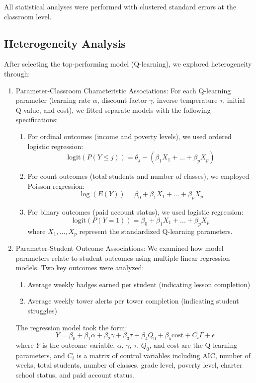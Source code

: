 \documentclass[
  number,
  preprint,
  3p,
  onecolumn]{elsarticle}
\providecommand{\tightlist}{%
  \setlength{\itemsep}{0pt}\setlength{\parskip}{0pt}}
\begin{document}
All statistical analyses were performed with clustered standard errors
at the classroom level.

\subsection{Heterogeneity Analysis}\label{heterogeneity-analysis}

After selecting the top-performing model (Q-learning), we explored
heterogeneity through:

\begin{enumerate}
\def\labelenumi{\arabic{enumi}.}
\item
  Parameter-Classroom Characteristic Associations: For each Q-learning
  parameter (learning rate \(\alpha\), discount factor \(\gamma\),
  inverse temperature \(\tau\), initial Q-value, and cost), we fitted
  separate models with the following specifications:

  \begin{enumerate}
  \def\labelenumii{\alph{enumii})}
  \tightlist
  \item
    For ordinal outcomes (income and poverty levels), we used ordered
    logistic regression: \[
    \text{logit}(P(Y \leq j)) = \theta_j - (\beta_1X_1 + ... + \beta_pX_p)
    \]
  \item
    For count outcomes (total students and number of classes), we
    employed Poisson regression: \[
    \log(E(Y)) = \beta_0 + \beta_1X_1 + ... + \beta_pX_p
    \]
  \item
    For binary outcomes (paid account status), we used logistic
    regression: \[
    \text{logit}(P(Y=1)) = \beta_0 + \beta_1X_1 + ... + \beta_pX_p
    \] where \(X_1, ..., X_p\) represent the standardized Q-learning
    parameters.
  \end{enumerate}
\item
  Parameter-Student Outcome Associations: We examined how model
  parameters relate to student outcomes using multiple linear regression
  models. Two key outcomes were analyzed:

  \begin{enumerate}
  \def\labelenumii{\alph{enumii})}
  \tightlist
  \item
    Average weekly badges earned per student (indicating lesson
    completion)
  \item
    Average weekly tower alerts per tower completion (indicating student
    struggles)
  \end{enumerate}

  The regression model took the form: \[
  Y = \beta_0 + \beta_1\alpha + \beta_2\gamma + \beta_3\tau + \beta_4Q_0 + \beta_5\text{cost} + C_i\Gamma + \epsilon
  \] where \(Y\) is the outcome variable, \(\alpha\), \(\gamma\),
  \(\tau\), \(Q_0\), and cost are the Q-learning parameters, and \(C_i\)
  is a matrix of control variables including AIC, number of weeks, total
  students, number of classes, grade level, poverty level, charter
  school status, and paid account status.
\end{enumerate}
\end{document}
